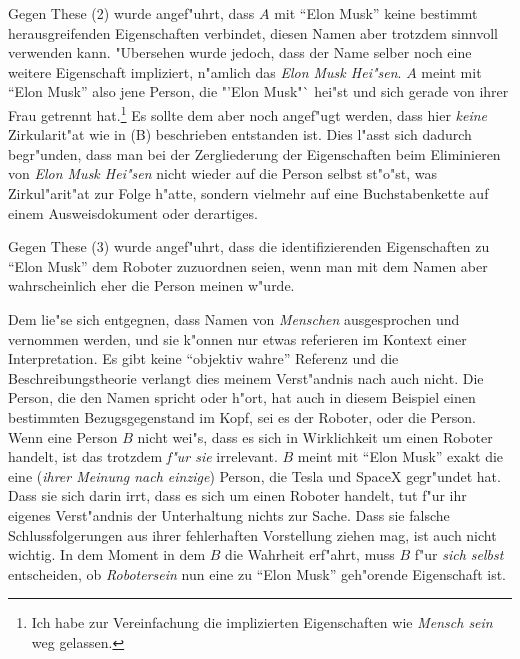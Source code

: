 \documentclass[a4paper, emulatestandardclasses, 12pt]{scrartcl}
\begin{document}
\begin{onehalfspace}
Gegen These (2) wurde angef"uhrt, dass $A$ mit "`Elon Musk"' keine bestimmt herausgreifenden Eigenschaften verbindet, diesen Namen aber trotzdem sinnvoll verwenden kann. "Ubersehen wurde jedoch, dass der Name selber noch eine weitere Eigenschaft impliziert, n"amlich das \emph{Elon Musk Hei"sen}. $A$ meint mit "`Elon Musk"' also jene Person, die "'Elon Musk"` hei"st und sich gerade von ihrer Frau getrennt hat.\footnote{Ich habe zur Vereinfachung die implizierten Eigenschaften wie \emph{Mensch sein} weg gelassen.} Es sollte dem aber noch angef"ugt werden, dass hier \emph{keine} Zirkularit"at wie in (B) beschrieben entstanden ist. Dies l"asst sich dadurch begr"unden, dass man bei der Zergliederung der Eigenschaften beim Eliminieren von \emph{Elon Musk Hei"sen} nicht wieder auf die Person selbst st"o"st, was Zirkul"arit"at zur Folge h"atte, sondern vielmehr auf eine Buchstabenkette auf einem Ausweisdokument oder derartiges.

Gegen These (3) wurde angef"uhrt, dass die identifizierenden Eigenschaften zu "`Elon Musk"' dem Roboter zuzuordnen seien, wenn man mit dem Namen aber wahrscheinlich eher die Person meinen w"urde.  

Dem lie"se sich entgegnen, dass Namen von \emph{Menschen} ausgesprochen und vernommen werden, und sie k"onnen nur etwas referieren im Kontext einer Interpretation. Es gibt keine "`objektiv wahre"' Referenz und die Beschreibungstheorie verlangt dies meinem Verst"andnis nach auch nicht. Die Person, die den Namen spricht oder h"ort, hat auch in diesem Beispiel einen bestimmten Bezugsgegenstand im Kopf, sei es der Roboter, oder die Person. Wenn eine Person $B$ nicht wei"s, dass es sich in Wirklichkeit um einen Roboter handelt, ist das trotzdem \emph{f"ur sie} irrelevant. $B$ meint mit "`Elon Musk"' exakt die eine (\emph{ihrer Meinung nach einzige}) Person, die Tesla und SpaceX gegr"undet hat. Dass sie sich darin irrt, dass es sich um einen Roboter handelt, tut f"ur ihr eigenes Verst"andnis der Unterhaltung nichts zur Sache. Dass sie falsche Schlussfolgerungen aus ihrer fehlerhaften Vorstellung ziehen mag, ist auch nicht wichtig. In dem Moment in dem $B$ die Wahrheit erf"ahrt, muss $B$ f"ur \emph{sich selbst} entscheiden, ob \emph{Robotersein} nun eine zu "`Elon Musk"' geh"orende Eigenschaft ist.



\end{onehalfspace}


\end{document}
